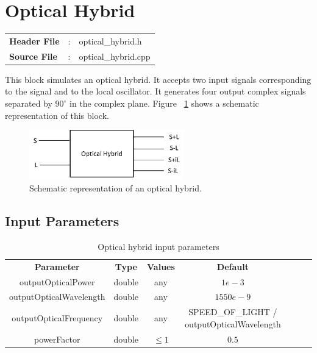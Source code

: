 \clearpage

\section{Optical Hybrid}

\begin{tcolorbox}	
	\begin{tabular}{p{2.75cm} p{0.2cm} p{10.5cm}} 	
		\textbf{Header File}   &:& optical\_hybrid.h \\
		\textbf{Source File}   &:& optical\_hybrid.cpp \\
	\end{tabular}
\end{tcolorbox}

This block simulates an optical hybrid. It accepts two input signals corresponding to the signal and to the local oscillator. It generates four output complex signals separated by $90^\circ$ in the complex plane. Figure ~\ref{opticalhybrid} shows a schematic representation of this block.

\begin{figure}[h]
	\centering\includegraphics[width=0.6\textwidth]{./lib/optical_hybrid/figures/optical_hybrid_block_diagram.png}
	\caption{Schematic representation of an optical hybrid.}\label{opticalhybrid}
\end{figure}

\subsection*{Input Parameters}

\begin{table}[h]
	\centering
	\begin{tabular}{|c|c|c|c|ccp{60mm}}
		\cline{1-4}
		\textbf{Parameter} & \textbf{Type} & \textbf{Values} &   \textbf{Default}& \\ \cline{1-4}
		outputOpticalPower & double & any & $1e-3$ \\ \cline{1-4}
		outputOpticalWavelength & double & any & $1550e-9$ \\ \cline{1-4}
		outputOpticalFrequency & double & any & SPEED\_OF\_LIGHT / outputOpticalWavelength \\ \cline{1-4}
		powerFactor & double & $\leq 1$ & $0.5$ \\ \cline{1-4} 
	\end{tabular}
	\caption{Optical hybrid input parameters}
	\label{table:optical_hybrid_in_par}
\end{table}

